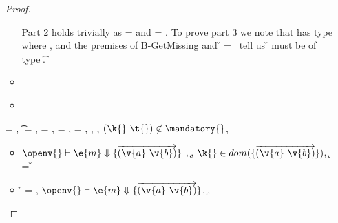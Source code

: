 \begin{lemma}
\begin{enumerate}
\begin{proof}
\begin{case}[T-GetHMapAbsent]
\begin{itemize}
\begin{subcase}[B-GetMissing]
         Part 2 holds trivially as \thenprop{\prop{}} = {\topprop{}}
         and \elseprop{\prop{}} = {\topprop{}}.
         To prove part 3 we note that  has type {\HMapgeneric {\mandatory{}} {\absent{}}}
         where {\inabsent{\k{}}{\absent{}}}, and
         the premises of B-GetMissing
         and
          \v{} = \nil\ 
         tell us {\v{}} must be of type {\t{}}.
      \end{subcase}
    \item[]
      \begin{subcase}[BE-Get1]
      \end{subcase}
    \item[]
      \begin{subcase}[BE-Get2]
      \end{subcase}
  \end{itemize}
\end{case}

\begin{case}[T-GetHMapPartialDefault]
  \e{} = { {}},
  \t{} = \Top,
  \thenprop{\prop{}} = {\topprop{}},
  \elseprop{\prop{}} = {\topprop{}},
  \object{} = {\replacefor
               { {\x{}}}
                          {}
                          {\x{}}},
 \judgement {\propenv{}} { {\HMapp {\mandatory{}} {\absent}}}
           {\filterset {\thenprop {\prop{m}}} {\elseprop {\prop{m}}}}
           {\object{m}},
  \judgementtwo {\propenv{}} { {}},
             ${\notinmandatory{\k{}}{\t{}}{\mandatory{}}}$,
             {\notinabsent{\k{}}{\absent{}}}

  \begin{itemize}
    \item[]
      \begin{subcase}[B-Get]
        $\opsem {\openv{}}
        {\e{m}} {\curlymap{\overrightarrow{({\v{a}}\ {\v{b}})}}}$
        ,
         \opsem {\openv{}}
                 {} {\k{}},
         $\keyinmap{\k{}}{\curlymap{\overrightarrow{({\v{a}}\ {\v{b}})}}}$,
         \getmap{\curlymap{\overrightarrow{({\v{a}}\ {\v{b}})}}} {\k{}} = {\v{}}

      \end{subcase}
    \item[]
      \begin{subcase}[B-GetMissing]
        \v{} = \nil,
        $\opsem {\openv{}}
        {\e{m}} {\curlymap{\overrightarrow{({\v{a}}\ {\v{b}})}}}$,
       \opsem {\openv{}} {\e{k}} {\k{}},


\end{subcase}
\end{itemize}
\end{case}
\end{proof}
\end{enumerate}
\end{lemma}
